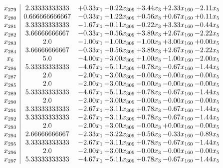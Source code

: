 \documentclass[8pt]{article}
\begin{document}
\[\begin{array}{c| c c@{\hskip 2pt} c@{\hskip 2pt} c@{\hskip 2pt} c@{\hskip 2pt} c@{\hskip 2pt} }
 x_{279}   &  2.33333333333 & +  0.33 x_{1} & -0.22 x_{309} & +  3.44 x_{3} & +  2.33 x_{160} & -2.11 x_{5}\\
 x_{280}   &  0.666666666667 & -0.33 x_{1} & +  1.22 x_{309} & +  0.56 x_{3} & +  0.67 x_{160} & +  0.11 x_{5}\\
 x_{281}   &  3.33333333333 & -1.67 x_{1} & +  0.11 x_{309} & -0.22 x_{3} & +  3.33 x_{160} & -0.44 x_{5}\\
 x_{282}   &  3.66666666667 & -0.33 x_{1} & +  0.56 x_{309} & +  3.89 x_{3} & +  2.67 x_{160} & -2.22 x_{5}\\
 x_{283}   &  2.0 & -1.00 x_{1} & -1.00 x_{309} & -1.00 x_{3} & +  3.00 x_{160} & +  0.00 x_{5}\\
 x_{284}   &  3.66666666667 & -0.33 x_{1} & +  0.56 x_{309} & +  3.89 x_{3} & +  2.67 x_{160} & -2.22 x_{5}\\
 x_{6}   &  5.0 & -4.00 x_{1} & +  3.00 x_{309} & +  1.00 x_{3} & -1.00 x_{160} & -2.00 x_{5}\\
 x_{286}   &  5.33333333333 & -4.67 x_{1} & +  5.11 x_{309} & +  0.78 x_{3} & -0.67 x_{160} & -1.44 x_{5}\\
 x_{287}   &  2.0 & -2.00 x_{1} & +  3.00 x_{309} & -0.00 x_{3} & -0.00 x_{160} & -0.00 x_{5}\\
 x_{285}   &  2.0 & -2.00 x_{1} & +  3.00 x_{309} & -0.00 x_{3} & -0.00 x_{160} & -0.00 x_{5}\\
 x_{289}   &  5.33333333333 & -4.67 x_{1} & +  5.11 x_{309} & +  0.78 x_{3} & -0.67 x_{160} & -1.44 x_{5}\\
 x_{290}   &  2.0 & -2.00 x_{1} & +  3.00 x_{309} & -0.00 x_{3} & -0.00 x_{160} & -0.00 x_{5}\\
 x_{291}   &  3.33333333333 & -2.67 x_{1} & +  3.11 x_{309} & +  0.78 x_{3} & -0.67 x_{160} & -1.44 x_{5}\\
 x_{292}   &  3.33333333333 & -2.67 x_{1} & +  3.11 x_{309} & +  0.78 x_{3} & -0.67 x_{160} & -1.44 x_{5}\\
 x_{293}   &  2.0 & -2.00 x_{1} & +  3.00 x_{309} & -0.00 x_{3} & +  0.00 x_{160} & -0.00 x_{5}\\
 x_{294}   &  2.66666666667 & -2.33 x_{1} & +  3.22 x_{309} & +  0.56 x_{3} & -0.33 x_{160} & -0.89 x_{5}\\
 x_{295}   &  3.33333333333 & -2.67 x_{1} & +  3.11 x_{309} & +  0.78 x_{3} & -0.67 x_{160} & -1.44 x_{5}\\
 x_{296}   &  2.0 & -2.00 x_{1} & +  3.00 x_{309} & -0.00 x_{3} & -0.00 x_{160} & -0.00 x_{5}\\
 x_{297}   &  5.33333333333 & -4.67 x_{1} & +  5.11 x_{309} & +  0.78 x_{3} & -0.67 x_{160} & -1.44 x_{5}\\

\end{array}\]
\end{document}
